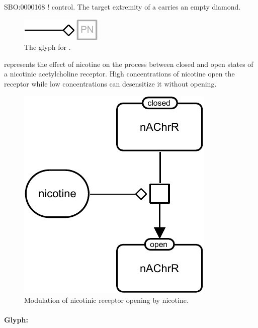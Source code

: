 \begin{glyphDescription}
 \glyphSboTerm SBO:0000168 ! control.
 \glyphEndPoint The target extremity of a  carries an empty diamond.
 \end{glyphDescription}

\begin{figure}[htb]
  \centering
  \includegraphics[scale = 0.5]{images/modulation}
  \caption{The \PD glyph for .}
  \label{fig:techref:modulation}
\end{figure}

 represents the effect of nicotine on the process between closed and open states of a nicotinic acetylcholine receptor. High concentrations of nicotine open the receptor while low concentrations can desensitize it without opening.

\begin{figure}[htb]
  \centering
  \includegraphics[scale = 0.5]{examples/modulation-nAChR}
  \caption{Modulation of nicotinic receptor opening by nicotine.}
  \label{fig:techref:modul-nico}
\end{figure}


\paragraph{Glyph: }\label{sec:techref:stimulation}


